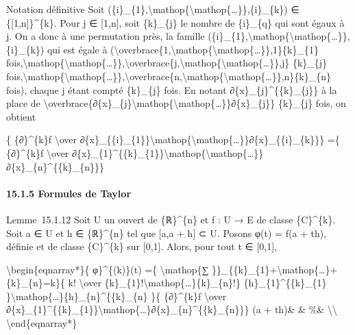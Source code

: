 Notation définitive Soit
(\{i\}\_\{1\},\textbackslash{}mathop\{\textbackslash{}mathop\{\ldots{}\}\},\{i\}\_\{k\})
∈ \{{[}1,n{]}\}\^{}\{k\}. Pour j ∈ {[}1,n{]}, soit \{k\}\_\{j\} le
nombre de \{i\}\_\{q\} qui sont égaux à j. On a donc à une permutation
près, la famille
(\{i\}\_\{1\},\textbackslash{}mathop\{\textbackslash{}mathop\{\ldots{}\}\},\{i\}\_\{k\})
qui est égale à
(\textbackslash{}overbrace\{1,\textbackslash{}mathop\{\textbackslash{}mathop\{\ldots{}\}\},1\}\{k\}\_\{1\}
fois,\textbackslash{}mathop\{\textbackslash{}mathop\{\ldots{}\}\},\textbackslash{}overbrace\{j,\textbackslash{}mathop\{\textbackslash{}mathop\{\ldots{}\}\},j\}
\{k\}\_\{j\}
fois,\textbackslash{}mathop\{\textbackslash{}mathop\{\ldots{}\}\},\textbackslash{}overbrace\{n,\textbackslash{}mathop\{\textbackslash{}mathop\{\ldots{}\}\},n\}\{k\}\_\{n\}
fois), chaque j étant compté \{k\}\_\{j\} fois. En notant
∂\{x\}\_\{j\}\^{}\{\{k\}\_\{j\}\} à la place de
\textbackslash{}overbrace\{∂\{x\}\_\{j\}\textbackslash{}mathop\{\textbackslash{}mathop\{\ldots{}\}\}∂\{x\}\_\{j\}\}
\{k\}\_\{j\} fois, on obtient

\{ \{∂\}\^{}\{k\}f \textbackslash{}over
∂\{x\}\_\{\{i\}\_\{1\}\}\textbackslash{}mathop\{\textbackslash{}mathop\{\ldots{}\}\}∂\{x\}\_\{\{i\}\_\{k\}\}\}
=\{ \{∂\}\^{}\{k\}f \textbackslash{}over
∂\{x\}\_\{1\}\^{}\{\{k\}\_\{1\}\}\textbackslash{}mathop\{\textbackslash{}mathop\{\ldots{}\}\}∂\{x\}\_\{n\}\^{}\{\{k\}\_\{n\}\}\}

\paragraph{15.1.5 Formules de Taylor}

Lemme~15.1.12 Soit U un ouvert de \{ℝ\}\^{}\{n\} et f : U → E de classe
\{C\}\^{}\{k\}. Soit a ∈ U et h ∈ \{ℝ\}\^{}\{n\} tel que {[}a,a + h{]} ⊂
U. Posons φ(t) = f(a + th), définie et de classe \{C\}\^{}\{k\} sur
{[}0,1{]}. Alors, pour tout t ∈ {[}0,1{]},

\textbackslash{}begin\{eqnarray*\}\{ φ\}\^{}\{(k)\}(t) =\{
\textbackslash{}mathop\{∑
\}\}\_\{\{k\}\_\{1\}+\textbackslash{}mathop\{\ldots{}\}+\{k\}\_\{n\}=k\}\{
k! \textbackslash{}over
\{k\}\_\{1\}!\textbackslash{}mathop\{\ldots{}\}\{k\}\_\{n\}!\}
\{h\}\_\{1\}\^{}\{\{k\}\_\{1\}
\}\textbackslash{}mathop\{\ldots{}\}\{h\}\_\{n\}\^{}\{\{k\}\_\{n\} \}\{
\{∂\}\^{}\{k\}f \textbackslash{}over
∂\{x\}\_\{1\}\^{}\{\{k\}\_\{1\}\}\textbackslash{}mathop\{\ldots{}\}∂\{x\}\_\{n\}\^{}\{\{k\}\_\{n\}\}\}
(a + th)\& \& \%\& \textbackslash{}\textbackslash{}
\textbackslash{}end\{eqnarray*\}

